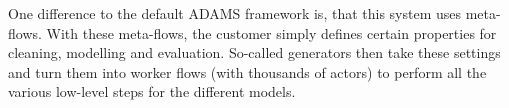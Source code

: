 \documentclass[wcp]{jmlr}
\begin{document}
One difference to the default ADAMS framework is, that this system uses meta-flows. With these meta-flows, the customer simply defines certain properties for cleaning, modelling and evaluation. So-called generators then take these settings and turn them into worker flows (with thousands of actors) to perform all the various low-level steps for the different models.



\end{document}
